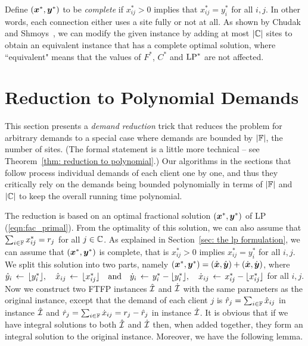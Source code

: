 \documentclass[11pt]{article}
\begin{document}

Define $(\boldsymbol{x}^\ast, \boldsymbol{y}^\ast)$ to be \emph{complete} if
$x_{ij}^\ast>0$ implies that $x_{ij}^\ast=y_i^\ast$ for all
$i,j$. In other words, each connection either uses a site
fully or not at all.  As shown by Chudak and
Shmoys~\cite{ChudakS04}, we can modify the given instance by
adding at most $|\mathbb{C}|$ sites to obtain an equivalent
instance that has a complete optimal solution, where
``equivalent" means that the values of $F^\ast$, $C^\ast$ and
$\mbox{\rm LP}^\ast$ are not affected.

\section{Reduction to Polynomial Demands}
\label{sec: polynomial demands}

This section presents a \emph{demand reduction} trick that
reduces the problem for arbitrary demands to a special case
where demands are bounded by $|\mathbb{F}|$, the number of
sites.  (The formal statement is a little more technical --
see Theorem~\ref{thm: reduction to polynomial}.)  Our
algorithms in the sections that follow process individual
demands of each client one by one, and thus they critically
rely on the demands being bounded polynomially in terms of
$|\mathbb{F}|$ and $|\mathbb{C}|$ to keep the overall running time polynomial.

The reduction is based on an optimal fractional solution
$(\boldsymbol{x}^\ast,\boldsymbol{y}^\ast)$ of LP (\ref{eqn:fac_primal}). From the
optimality of this solution, we can also assume that
$\sum_{i\in\mathbb{F}} x^\ast_{ij} = r_j$ for all
$j\in\mathbb{C}$.  As explained in Section~\ref{sec: the lp
  formulation}, we can assume that $(\boldsymbol{x}^\ast,\boldsymbol{y}^\ast)$
is complete, that is $x^\ast_{ij} > 0$ implies $x^\ast_{ij}
= y^\ast_i$ for all $i,j$.  We split this solution into two
parts, namely $(\boldsymbol{x}^\ast,\boldsymbol{y}^\ast) = (\hat{\boldsymbol{x}},\hat{\boldsymbol{y}})+
(\dot{\boldsymbol{x}},\dot{\boldsymbol{y}})$, where
%
${\hat y}_i \;{\,\leftarrow\,}\; { \lfloor y_i^\ast \rfloor }, \quad
			{\hat x}_{ij} \;{\,\leftarrow\,}\; { \lfloor x_{ij}^\ast \rfloor } \quad\textrm{and}\quad
{\dot y}_i \;{\,\leftarrow\,}\; y_i^\ast - { \lfloor y_i^\ast \rfloor }, \quad
 	{\dot x}_{ij} \;{\,\leftarrow\,}\; x_{ij}^\ast -  { \lfloor x_{ij}^\ast \rfloor }
$
%
for all $i,j$. Now we construct two
FTFP instances ${\hat{\cal I}}$ and ${\dot{\cal I}}$ with the same
parameters as the original instance, except that the demand of each client $j$ is
${\hat r}_j = \sum_{i\in\mathbb{F}} {\hat x}_{ij}$ in instance ${\hat{\cal I}}$ and
${\dot r}_j = \sum_{i\in\mathbb{F}} {\dot x}_{ij} = r_j - {\hat r}_j$ in instance ${\dot{\cal I}}$. 
It is obvious that if we have integral solutions to both ${\hat{\cal I}}$
and ${\dot{\cal I}}$ then, when added together, they form an integral
solution to the original instance.  Moreover, we have the
following lemma.
\end{document}
